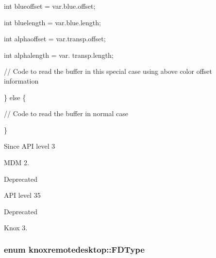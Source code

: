 \begin{DoxyPre}			int blueoffset = var.blue.offset;\end{DoxyPre}



\begin{DoxyPre}			int bluelength = var.blue.length;\end{DoxyPre}



\begin{DoxyPre}			int alphaoffset = var.transp.offset;\end{DoxyPre}



\begin{DoxyPre}			int alphalength = var. transp.length;\end{DoxyPre}



\begin{DoxyPre}		   // Code to read the buffer in this special case using above color offset information\end{DoxyPre}



\begin{DoxyPre}		\} else \{\end{DoxyPre}



\begin{DoxyPre}			// Code to read the buffer in normal case\end{DoxyPre}



\begin{DoxyPre}		\}\end{DoxyPre}



\begin{DoxyPre}      \end{DoxyPre}


\par


\begin{DoxySince}{\-Since}
\-A\-P\-I level 3

\-M\-D\-M 2.
\end{DoxySince}
\begin{DoxyRefDesc}{\-Deprecated}
\item[{\bf \-Deprecated}]\-A\-P\-I level 35\end{DoxyRefDesc}


\begin{DoxyRefDesc}{\-Deprecated}
\item[{\bf \-Deprecated}]\-Knox 3.\end{DoxyRefDesc}
\hypertarget{namespaceknoxremotedesktop_a01c73ba2fbebc2395aae6198eb87a416}{
\subsubsection[{\-F\-D\-Type}]{\setlength{\rightskip}{0pt plus 5cm}enum {\bf knoxremotedesktop\-::\-F\-D\-Type}}}\label{namespaceknoxremotedesktop_a01c73ba2fbebc2395aae6198eb87a416}


